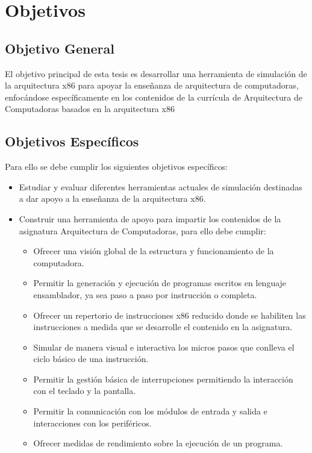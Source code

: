 \documentclass[12pt,twoside]{templates/unerthesis}
\providecommand{\tightlist}{%
  \setlength{\itemsep}{0pt}\setlength{\parskip}{0pt}}
\begin{document}
\hypertarget{objetivos}{%
\section{Objetivos}\label{objetivos}}

\hypertarget{objetivo-general}{%
\subsection{Objetivo General}\label{objetivo-general}}

El objetivo principal de esta tesis es desarrollar una herramienta de simulación de la arquitectura x86 para apoyar la enseñanza de arquitectura de computadoras, enfocándose específicamente en los contenidos de la currícula de Arquitectura de Computadoras basados en la arquitectura x86

\hypertarget{objetivos-especuxedficos}{%
\subsection{Objetivos Específicos}\label{objetivos-especuxedficos}}

Para ello se debe cumplir los siguientes objetivos específicos:

\begin{itemize}
\tightlist
\item
  Estudiar y evaluar diferentes herramientas actuales de simulación destinadas a dar apoyo a la enseñanza de la arquitectura x86.
\item
  Construir una herramienta de apoyo para impartir los contenidos de la asignatura Arquitectura de Computadoras, para ello debe cumplir:

  \begin{itemize}
  \tightlist
  \item
    Ofrecer una visión global de la estructura y funcionamiento de la computadora.
  \item
    Permitir la generación y ejecución de programas escritos en lenguaje ensamblador, ya sea paso a paso por instrucción o completa.
  \item
    Ofrecer un repertorio de instrucciones x86 reducido donde se habiliten las instrucciones a medida que se desarrolle el contenido en la asignatura.
  \item
    Simular de manera visual e interactiva los micros pasos que conlleva el ciclo básico de una instrucción.
  \item
    Permitir la gestión básica de interrupciones permitiendo la interacción con el teclado y la pantalla.
  \item
    Permitir la comunicación con los módulos de entrada y salida e interacciones con los periféricos.
  \item
    Ofrecer medidas de rendimiento sobre la ejecución de un programa.
  \end{itemize}
\end{itemize}
\end{document}
